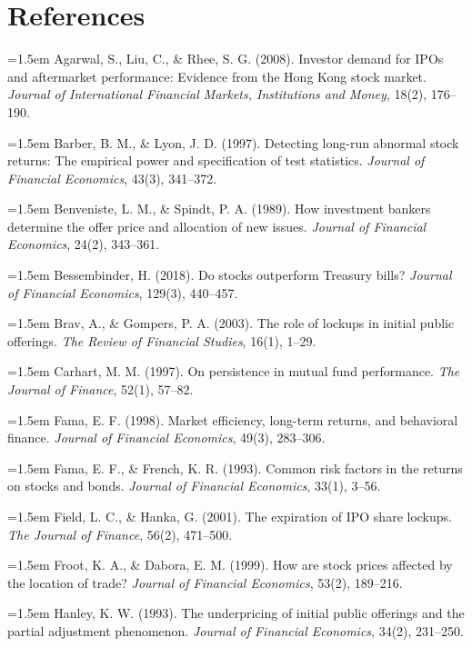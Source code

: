 \documentclass[12pt,letterpaper]{article}
\begin{document}
\section*{References}
\begin{singlespacing}
{\small\setlength{\parskip}{2pt}
\noindent\hangindent=1.5em Agarwal, S., Liu, C., \& Rhee, S. G. (2008). Investor demand for IPOs and aftermarket performance: Evidence from the Hong Kong stock market. \textit{Journal of International Financial Markets, Institutions and Money}, 18(2), 176--190.\par
\noindent\hangindent=1.5em Barber, B. M., \& Lyon, J. D. (1997). Detecting long-run abnormal stock returns: The empirical power and specification of test statistics. \textit{Journal of Financial Economics}, 43(3), 341--372.\par
\noindent\hangindent=1.5em Benveniste, L. M., \& Spindt, P. A. (1989). How investment bankers determine the offer price and allocation of new issues. \textit{Journal of Financial Economics}, 24(2), 343--361.\par
\noindent\hangindent=1.5em Bessembinder, H. (2018). Do stocks outperform Treasury bills? \textit{Journal of Financial Economics}, 129(3), 440--457.\par
\noindent\hangindent=1.5em Brav, A., \& Gompers, P. A. (2003). The role of lockups in initial public offerings. \textit{The Review of Financial Studies}, 16(1), 1--29.\par
\noindent\hangindent=1.5em Carhart, M. M. (1997). On persistence in mutual fund performance. \textit{The Journal of Finance}, 52(1), 57--82.\par
\noindent\hangindent=1.5em Fama, E. F. (1998). Market efficiency, long-term returns, and behavioral finance. \textit{Journal of Financial Economics}, 49(3), 283--306.\par
\noindent\hangindent=1.5em Fama, E. F., \& French, K. R. (1993). Common risk factors in the returns on stocks and bonds. \textit{Journal of Financial Economics}, 33(1), 3--56.\par
\noindent\hangindent=1.5em Field, L. C., \& Hanka, G. (2001). The expiration of IPO share lockups. \textit{The Journal of Finance}, 56(2), 471--500.\par
\noindent\hangindent=1.5em Froot, K. A., \& Dabora, E. M. (1999). How are stock prices affected by the location of trade? \textit{Journal of Financial Economics}, 53(2), 189--216.\par
\noindent\hangindent=1.5em Hanley, K. W. (1993). The underpricing of initial public offerings and the partial adjustment phenomenon. \textit{Journal of Financial Economics}, 34(2), 231--250.\par
}
\end{singlespacing}
\end{document}

